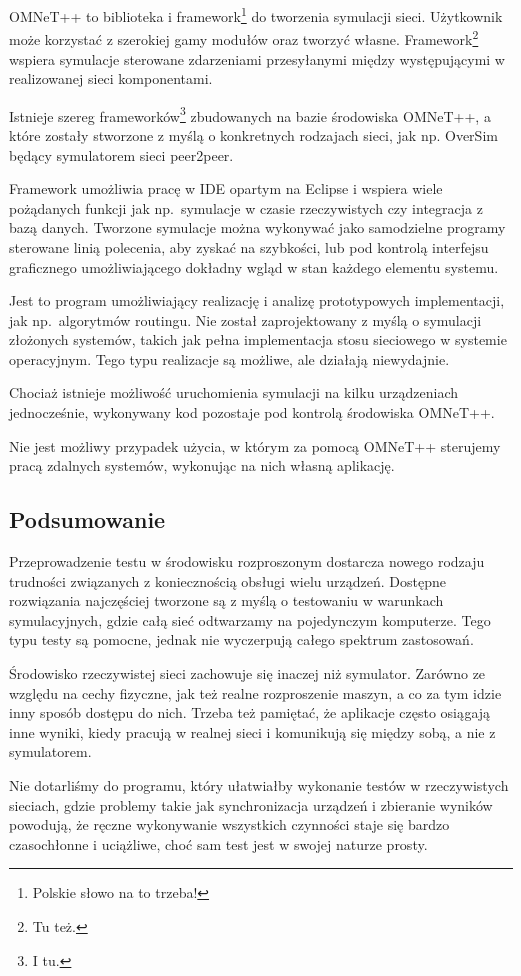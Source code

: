 \documentclass[00-praca-magisterska.tex]{subfiles}
\begin{document}
OMNeT++ to biblioteka i framework\footnote{Polskie słowo na to trzeba!} do
tworzenia symulacji sieci. Użytkownik może korzystać z szerokiej gamy modułów
oraz tworzyć własne. Framework\footnote{Tu też.} wspiera symulacje sterowane
zdarzeniami przesyłanymi między występującymi w realizowanej sieci komponentami.

Istnieje szereg frameworków\footnote{I tu.} zbudowanych na bazie środowiska
OMNeT++, a które zostały stworzone z myślą o konkretnych rodzajach sieci, jak
np. OverSim będący symulatorem sieci peer2peer.

Framework umożliwia pracę w IDE opartym na Eclipse i wspiera wiele pożądanych
funkcji jak np.~symulacje w czasie rzeczywistych czy integracja z bazą danych.
Tworzone symulacje można wykonywać jako samodzielne programy sterowane linią
polecenia, aby zyskać na szybkości, lub pod kontrolą interfejsu graficznego
umożliwiającego dokładny wgląd w stan każdego elementu systemu.

Jest to program umożliwiający realizację i analizę prototypowych implementacji,
jak np.~algorytmów routingu. Nie został zaprojektowany z myślą o symulacji
złożonych systemów, takich jak pełna implementacja stosu sieciowego w systemie
operacyjnym. Tego typu realizacje są możliwe, ale działają niewydajnie.

Chociaż istnieje możliwość uruchomienia symulacji na kilku urządzeniach
jednocześnie, wykonywany kod pozostaje pod kontrolą środowiska OMNeT++.

Nie jest możliwy przypadek użycia, w którym za pomocą OMNeT++ sterujemy pracą
zdalnych systemów, wykonując na nich własną aplikację.

\subsection{Podsumowanie}

Przeprowadzenie testu w środowisku rozproszonym dostarcza nowego rodzaju
trudności związanych z koniecznością obsługi wielu urządzeń. Dostępne
rozwiązania najczęściej tworzone są z myślą o testowaniu w warunkach
symulacyjnych, gdzie całą sieć odtwarzamy na pojedynczym komputerze. Tego typu
testy są pomocne, jednak nie wyczerpują całego spektrum zastosowań.

Środowisko rzeczywistej sieci zachowuje się inaczej niż symulator. Zarówno ze
względu na cechy fizyczne, jak też realne rozproszenie maszyn, a co za tym
idzie inny sposób dostępu do nich. Trzeba też pamiętać, że aplikacje często
osiągają inne wyniki, kiedy pracują w realnej sieci i komunikują się między
sobą, a nie z symulatorem.

Nie dotarliśmy do programu, który ułatwiałby wykonanie testów w
rzeczywistych sieciach, gdzie problemy takie jak synchronizacja urządzeń i
zbieranie wyników powodują, że ręczne wykonywanie wszystkich czynności staje
się bardzo czasochłonne i uciążliwe, choć sam test jest w swojej naturze prosty.

\end{document}
